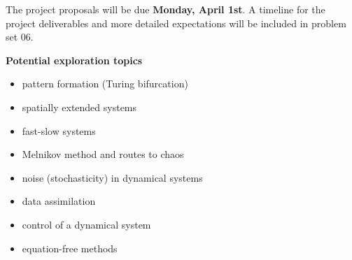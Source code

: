 \documentclass[12pt,letterpaper]{exam}
\begin{document}
\begin{questions}
The project proposals will be due \textbf{Monday, April 1st}.  A timeline for the project deliverables and more detailed expectations will be included in problem set 06.

\textbf{Potential exploration topics}
\begin{itemize}
    \item pattern formation (Turing bifurcation)
    \item spatially extended systems
    \item fast-slow systems
    \item Melnikov method and routes to chaos
    \item noise (stochasticity) in dynamical systems
    \item data assimilation
    \item control of a dynamical system
    \item equation-free methods
\end{itemize}

\nocite{*}



    

\end{questions}
\end{document}
